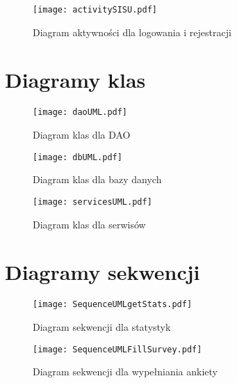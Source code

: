 \begin{figure}[htbp]
  \centering
  \texttt{[image: activitySISU.pdf]}
  \caption{Diagram aktywności dla logowania i rejestracji}
\end{figure}

\section{Diagramy klas}

\begin{figure}[htbp]
  \centering
  \texttt{[image: daoUML.pdf]}
  \caption{Diagram klas dla DAO}
\end{figure}

\begin{figure}[htbp]
  \centering
  \texttt{[image: dbUML.pdf]}
  \caption{Diagram klas dla bazy danych}
\end{figure}

\begin{figure}[htbp]
  \centering
  \texttt{[image: servicesUML.pdf]}
  \caption{Diagram klas dla serwisów}
\end{figure}

\section{Diagramy sekwencji}

\begin{figure}[htbp]
  \centering
  \texttt{[image: SequenceUMLgetStats.pdf]}
  \caption{Diagram sekwencji dla statystyk}
\end{figure}


\begin{figure}[htbp]
  \centering
  \texttt{[image: SequenceUMLFillSurvey.pdf]}
  \caption{Diagram sekwencji dla wypełniania ankiety}
\end{figure}
